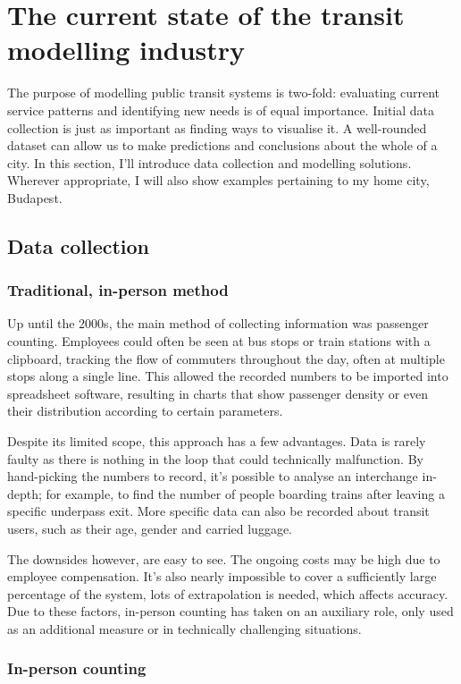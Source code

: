 \chapter{The current state of the transit modelling industry}
The purpose of modelling public transit systems is two-fold: evaluating current service patterns and identifying new needs is of equal importance. Initial data collection is just as important as finding ways to visualise it. A well-rounded dataset can allow us to make predictions and conclusions about the whole of a city. In this section, I'll introduce data collection and modelling solutions. Wherever appropriate, I will also show examples pertaining to my home city, Budapest.

\section{Data collection}
\subsection{Traditional, in-person method}

Up until the 2000s, the main method of collecting information was passenger counting. Employees could often be seen at bus stops or train stations with a clipboard, tracking the flow of commuters throughout the day, often at multiple stops along a single line. This allowed the recorded numbers to be imported into spreadsheet software, resulting in charts that show passenger density or even their distribution according to certain parameters.

Despite its limited scope, this approach has a few advantages. Data is rarely faulty as there is nothing in the loop that could technically malfunction. By hand-picking the numbers to record, it's possible to analyse an interchange in-depth; for example, to find the number of people boarding trains after leaving a specific underpass exit. More specific data can also be recorded about transit users, such as their age, gender and carried luggage.

The downsides however, are easy to see. The ongoing costs may be high due to employee compensation. It's also nearly impossible to cover a sufficiently large percentage of the system, lots of extrapolation is needed, which affects accuracy. Due to these factors, in-person counting has taken on an auxiliary role, only used as an additional measure or in technically challenging situations.

\subsection{In-person counting}

